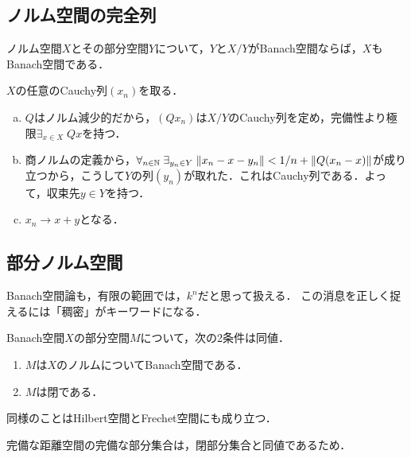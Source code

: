 \documentclass[uplatex,dvipdfmx]{jsreport}
\begin{document}
\subsection{ノルム空間の完全列}

\begin{proposition}[Banach空間の標準分解]
    ノルム空間$X$とその部分空間$Y$について，$Y$と$X/Y$がBanach空間ならば，$X$もBanach空間である．
\end{proposition}
\begin{Proof}
    $X$の任意のCauchy列$(x_n)$を取る．
    \begin{enumerate}[(a)]
        \item $Q$はノルム減少的だから，$(Qx_n)$は$X/Y$のCauchy列を定め，完備性より極限$\exists_{x\in X}\;Qx$を持つ．
        \item 商ノルムの定義から，$\forall_{n\in\mathbb{N}}\;\exists_{y_n\in Y}\;\|x_n-x-y_n\|<1/n+\|Q(x_n-x)\|$が成り立つから，こうして$Y$の列$(y_n)$が取れた．これはCauchy列である．よって，収束先$y\in Y$を持つ．
        \item $x_n\to x+y$となる．
    \end{enumerate}
\end{Proof}

\subsection{部分ノルム空間}

\begin{tcolorbox}[colframe=ForestGreen, colback=ForestGreen!10!white,breakable,colbacktitle=ForestGreen!40!white,coltitle=black,fonttitle=\bfseries\sffamily,
title=連続線形延長の算譜]
    Banach空間論も，有限の範囲では，$k^n$だと思って扱える．
    この消息を正しく捉えるには「稠密」がキーワードになる．
\end{tcolorbox}

\begin{proposition}[完備性の弱遺伝性]
    Banach空間$X$の部分空間$M$について，次の2条件は同値．
    \begin{enumerate}
        \item $M$は$X$のノルムについてBanach空間である．
        \item $M$は閉である．
    \end{enumerate}
    同様のことはHilbert空間とFrechet空間にも成り立つ．
\end{proposition}
\begin{Proof}
    完備な距離空間の完備な部分集合は，閉部分集合と同値であるため．
\end{Proof}
\end{document}
